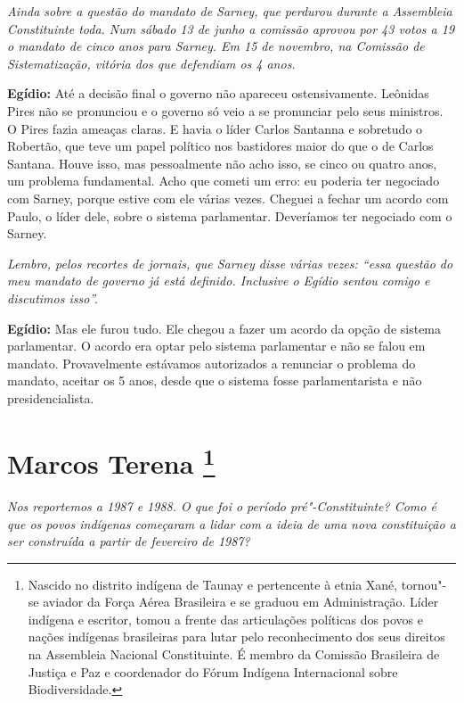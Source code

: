 \emph{Ainda sobre a questão do mandato de Sarney, que perdurou durante
a Assembleia Constituinte toda. Num sábado 13 de junho a comissão
aprovou por 43 votos a 19 o mandato de cinco anos para Sarney. Em 15 de
novembro, na Comissão de Sistematização, vitória dos que defendiam os 4
anos.}

\textbf{Egídio:} Até a decisão final o governo não apareceu
ostensivamente. Leônidas Pires não se pronunciou e o governo só veio a
se pronunciar pelo seus ministros. O Pires fazia ameaças claras. E havia
o líder Carlos Santanna e sobretudo o Robertão, que teve um papel
político nos bastidores maior do que o de Carlos Santana. Houve isso,
mas pessoalmente não acho isso, se cinco ou quatro anos, um problema
fundamental. Acho que cometi um erro: eu poderia ter negociado com
Sarney, porque estive com ele várias vezes. Cheguei a fechar um acordo
com Paulo, o líder dele, sobre o sistema parlamentar. Deveríamos ter
negociado com o Sarney.

\emph{Lembro, pelos recortes de jornais, que Sarney disse várias
vezes: ``essa questão do meu mandato de governo já está definido.
Inclusive o Egídio sentou comigo e discutimos isso''.}

\textbf{Egídio:} Mas ele furou tudo. Ele chegou a fazer um acordo da
opção de sistema parlamentar. O acordo era optar pelo sistema
parlamentar e não se falou em mandato. Provavelmente estávamos
autorizados a renunciar o problema do mandato, aceitar os 5 anos, desde
que o sistema fosse parlamentarista e não presidencialista.

\chapter{Marcos Terena
\footnote{Nascido no distrito indígena de Taunay e pertencente à etnia Xané,
tornou"-se aviador da Força Aérea Brasileira e se graduou em
Administração. Líder indígena e escritor, tomou a frente das
articulações políticas dos povos e nações indígenas brasileiras para
lutar pelo reconhecimento dos seus direitos na Assembleia Nacional
Constituinte. É membro da Comissão Brasileira de Justiça e Paz e
coordenador do Fórum Indígena Internacional sobre Biodiversidade.}}

\emph{Nos reportemos a 1987 e 1988. O que foi o período
pré"-Constituinte? Como é que os povos indígenas começaram a lidar com a
ideia de uma nova constituição a ser construída a partir de fevereiro de
1987?}

